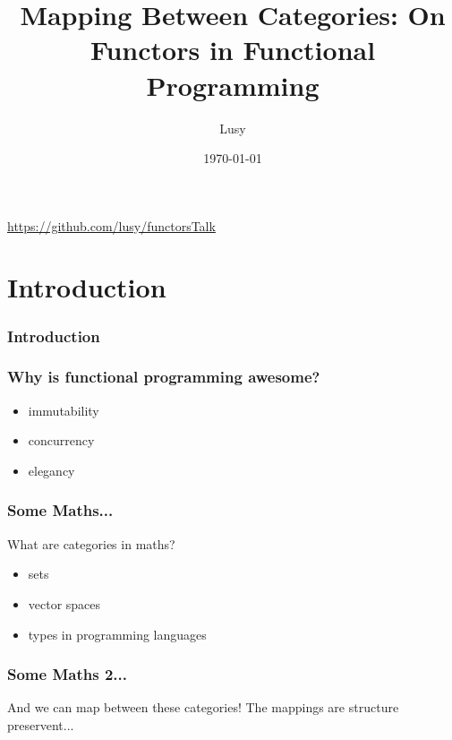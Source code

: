 \documentclass[12pt, xcolor=table]{beamer}
\begin{document}
\title{Mapping Between Categories: On Functors in Functional Programming}
\author{Lusy}
\date{\today}

\begin{frame}
    \titlepage
    \begin{block}
        \tiny \url{https://github.com/lusy/functorsTalk}
    \end{block}
\end{frame}

\section{Introduction} %
\begin{frame}
     \frametitle{Introduction}
\end{frame}

\begin{frame}
    \frametitle{Why is functional programming awesome?}
    \begin{itemize}
        \item immutability %
        \item concurrency %
        \item elegancy
    \end{itemize}
\end{frame}


\begin{frame}
    \frametitle{Some Maths...}
    What are categories in maths?
    \begin{itemize}
        \item sets
        \item vector spaces
        \item types in programming languages
    \end{itemize}
\end{frame}

\begin{frame}
    \frametitle{Some Maths 2...}
    And we can map between these categories!
    The mappings are structure preservent...
\end{frame}
\end{document}
